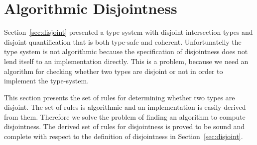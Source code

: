 \section{Algorithmic Disjointness} \label{sec:alg-dis}

Section~\ref{sec:disjoint} presented a type system with disjoint
intersection types and disjoint quantification that is both type-safe
and coherent. Unfortunatelly the type system is not algorithmic
because the specification of disjointness does not lend itself to an
implementation directly. This is a problem, because we need an
algorithm for checking whether two types are disjoint or not in order
to implement the type-system.

\begin{comment}
Now that we have obtained a specification for disjointness, but the definition
involves an existence problem. How can we implement it? One possibility is
bidirectional subtyping, that is, we say two types, $A$ and $B$, are disjoint if
neither $A \subtype B$ nor $B \subtype A$. However, this implementation is
wrong. For example, $\tyint \inter \tystring$ and $\tystring \inter \tychar$ are
not disjoint by specification since $\tystring$ is their common supertype. Yet
by the implementation they are, since neither of them is a subtype of
the other. \bruno{You need a concrete code example to make this point.}
Hence the algorithmic rules are more nuanced. For now, it is enough to treat the
disjoint judgement $\jdis \Gamma A B$ as oracle and we will come back to
this topic in the next section.
\end{comment}

This section presents the set of rules for determining whether two
types are disjoint. The set of rules is algorithmic and an
implementation is easily derived from them. Therefore we solve the
problem of finding an algorithm to compute disjointness.  The derived
set of rules for disjointness is proved to be sound and complete with
respect to the definition of disjointness in
Section~\ref{sec:disjoint}.

